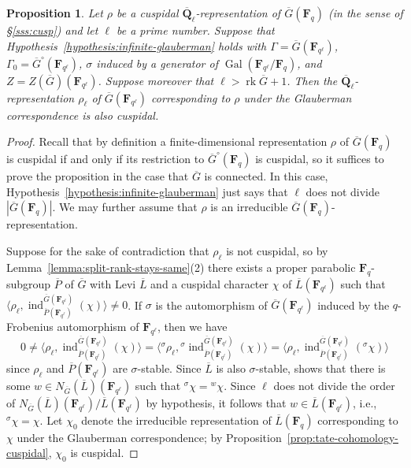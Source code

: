 \documentclass[reqno]{amsart}
\numberwithin{equation}{subsection}
\newcommand{\F}{\mathbf{F}}
\newcommand{\Q}{\mathbf{Q}}
\newcommand{\Gal}{\operatorname{Gal}}
\newcommand{\ol}[1]{\overline{#1}}
\DeclareMathOperator{\ind}{ind}
\DeclareMathOperator{\rk}{rk}
\newtheorem{prop}[thm]{Proposition}
\theoremstyle{remark}
\numberwithin{equation}{subsection}
\numberwithin{figure}{subsection}
\begin{document}
\begin{prop}\label{prop:glauberman-cuspidal}
    Let $\rho$ be a cuspidal $\ol\Q_\ell$-representation of $\ol G(\F_q)$ (in the sense of \S\ref{sss:cusp}) and let $\ell$ be a prime number. Suppose that Hypothesis~\ref{hypothesis:infinite-glauberman} holds with $\Gamma = \ol G(\F_{q^\ell})$, $\Gamma_0 = \ol G^\circ(\F_{q^\ell})$, $\sigma$ induced by a generator of $\Gal(\F_{q^\ell}/\F_q)$, and $Z = Z(\ol G)(\F_{q^\ell})$. Suppose moreover that $\ell > \rk \ol G + 1$. Then the $\ol\Q_\ell$-representation $\rho_\ell$ of $\ol G(\F_{q^\ell})$ corresponding to $\rho$ under the Glauberman correspondence is also cuspidal.
\end{prop}

\begin{proof}
    Recall that by definition a finite-dimensional representation $\rho$ of $\ol G(\F_q)$ is cuspidal if and only if its restriction to $\ol G^\circ(\F_q)$ is cuspidal, so it suffices to prove the proposition in the case that $\ol G$ is connected. In this case, Hypothesis~\ref{hypothesis:infinite-glauberman} just says that $\ell$ does not divide $|\ol G(\F_q)|$. We may further assume that $\rho$ is an irreducible $\ol G(\F_q)$-representation.
    
    Suppose for the sake of contradiction that $\rho_\ell$ is not cuspidal, so by Lemma~\ref{lemma:split-rank-stays-same}(2) there exists a proper parabolic $\F_q$-subgroup $\ol P$ of $\ol G$ with Levi $\ol L$ and a cuspidal character $\chi$ of $\ol L(\F_{q^\ell})$ such that $\langle\rho_\ell, \ind_{\ol P(\F_{q^\ell})}^{\ol G(\F_{q^\ell})}(\chi)\rangle \neq 0$. If $\sigma$ is the automorphism of $\ol G(\F_{q^\ell})$ induced by the $q$-Frobenius automorphism of $\F_{q^\ell}$, then we have
    \[
    0 \neq \langle \rho_\ell, \ind_{\ol P(\F_{q^\ell})}^{\ol G(\F_{q^\ell})}(\chi)\rangle = \langle{}^\sigma\rho_\ell, {}^\sigma\ind_{\ol P(\F_{q^\ell})}^{\ol G(\F_{q^\ell})}(\chi)\rangle = \langle\rho_\ell, \ind_{\ol P(\F_{q^\ell})}^{\ol G(\F_{q^\ell})}({}^\sigma\chi)\rangle
    \]
    since $\rho_\ell$ and $\ol P(\F_{q^\ell})$ are $\sigma$-stable. Since $\ol L$ is also $\sigma$-stable, \cite[Proposition~9.1.5]{Car85} shows that there is some $w \in N_{\ol G}(\ol L)(\F_{q^\ell})$ such that $^\sigma\chi = {}^w\chi$. Since $\ell$ does not divide the order of $N_{\ol G}(\ol L)(\F_{q^\ell})/\ol L(\F_{q^\ell})$ by hypothesis, it follows that $w \in \ol L(\F_{q^\ell})$, i.e., $^\sigma\chi = \chi$. Let $\chi_0$ denote the irreducible representation of $\ol L(\F_q)$ corresponding to $\chi$ under the Glauberman correspondence; by Proposition~\ref{prop:tate-cohomology-cuspidal}, $\chi_0$ is cuspidal.
    

\end{proof}
\end{document}
